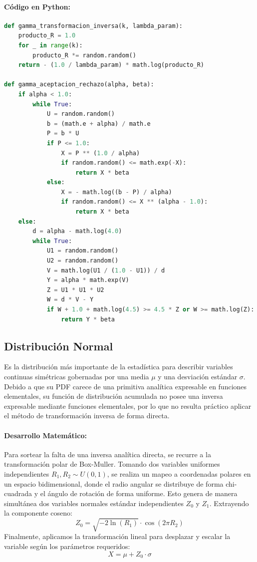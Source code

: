 \documentclass{article}
\begin{document}
\paragraph{Código en Python:}
\begin{lstlisting}[language=Python, caption=Generador para Distribución Gamma por sus dos métodos obligatorios.]
def gamma_transformacion_inversa(k, lambda_param):
    producto_R = 1.0
    for _ in range(k):
        producto_R *= random.random()
    return - (1.0 / lambda_param) * math.log(producto_R)

def gamma_aceptacion_rechazo(alpha, beta):
    if alpha < 1.0:
        while True:
            U = random.random()
            b = (math.e + alpha) / math.e
            P = b * U
            if P <= 1.0:
                X = P ** (1.0 / alpha)
                if random.random() <= math.exp(-X):
                    return X * beta
            else:
                X = - math.log((b - P) / alpha)
                if random.random() <= X ** (alpha - 1.0):
                    return X * beta
    else:
        d = alpha - math.log(4.0)
        while True:
            U1 = random.random()
            U2 = random.random()
            V = math.log(U1 / (1.0 - U1)) / d
            Y = alpha * math.exp(V)
            Z = U1 * U1 * U2
            W = d * V - Y
            if W + 1.0 + math.log(4.5) >= 4.5 * Z or W >= math.log(Z):
                return Y * beta
\end{lstlisting}

\subsection{Distribución Normal}
Es la distribución más importante de la estadística para describir variables continuas simétricas gobernadas por una media $\mu$ y una desviación estándar $\sigma$. Debido a que su PDF carece de una primitiva analítica expresable en funciones elementales, su función de distribución acumulada no posee una inversa expresable mediante funciones elementales, por lo que no resulta práctico aplicar el método de transformación inversa de forma directa.

\paragraph{Desarrollo Matemático:}
Para sortear la falta de una inversa analítica directa, se recurre a la transformación polar de Box-Muller. Tomando dos variables uniformes independientes $R_1, R_2 \sim U(0,1)$, se realiza un mapeo a coordenadas polares en un espacio bidimensional, donde el radio angular se distribuye de forma chi-cuadrada y el ángulo de rotación de forma uniforme. Esto genera de manera simultánea dos variables normales estándar independientes $Z_0$ y $Z_1$. Extrayendo la componente coseno:
\begin{equation}
Z_0 = \sqrt{-2 \ln(R_1)} \cdot \cos(2\pi R_2)
\end{equation}
Finalmente, aplicamos la transformación lineal para desplazar y escalar la variable según los parámetros requeridos:
\begin{equation}
X = \mu + Z_0 \cdot \sigma
\end{equation}
\end{document}
